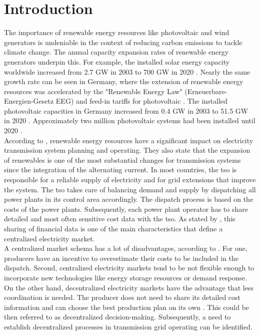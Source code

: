 \section{Introduction}
\label{sec:intro}

The importance of renewable energy resources like photovoltaic and wind generators is undeniable in the context of reducing carbon emissions to tackle climate change. The annual capacity expansion rates of renewable energy generators underpin this. For example, the installed solar energy capacity worldwide increased from 2.7 GW in 2003 to 700 GW in 2020 \citep{ritchie2020}. Nearly the same growth rate can be seen in Germany, where the extension of renewable energy resources was accelerated by the "Renewable Energy Law" (Erneuerbare-Energien-Gesetz EEG) and feed-in tariffs for photovoltaic \citep{pesch2014}. The installed photovoltaic capacities in Germany increased from 0.4 GW in 2003 to 51.5 GW in 2020 \citep{bundesnetzagentur2021}. Approximately two million photovoltaic systems had been installed until 2020 \citep{bundesnetzagentur2021}.\\

According to \citet{quint2019}, renewable energy resources have a significant impact on electricity transmission system planning and operating. They also state that the expansion of renewables is one of the most substantial changes for transmission systems since the integration of the alternating current. In most countries, the \gls{tso} is responsible for a reliable supply of electricity and for grid extensions that improve the system. The \gls{tso} takes care of balancing demand and supply by dispatching all power plants in its control area accordingly. The dispatch process is based on the costs of the power plants. Subsequently, each power plant operator has to share detailed and most often sensitive cost data with the \gls{tso}. As stated by \citet{ahlqvist2022}, this sharing of financial data is one of the main characteristics that define a centralized electricity market. \\

A centralized market schema has a lot of disadvantages, according to \citet{ahlqvist2022}. For one, producers have an incentive to overestimate their costs to be included in the dispatch. Second, centralized electricity markets tend to be not flexible enough to incorporate new technologies like energy storage resources or demand response. On the other hand, decentralized electricity markets have the advantage that less coordination is needed. The producer does not need to share its detailed cost information and can choose the best production plan on its own \citep{ahlqvist2022}. This could be then referred to as decentralized decision-making. Subsequently, a need to establish decentralized processes in transmission grid operating can be identified. \\

